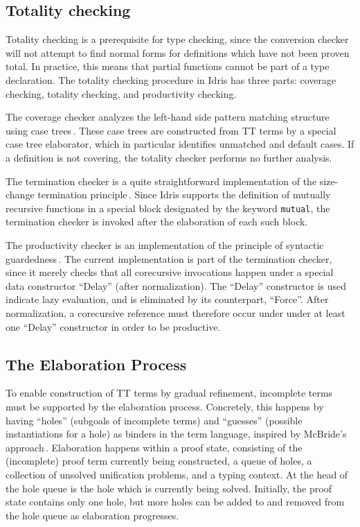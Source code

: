 \subsection{Totality checking}
Totality checking is a prerequisite for type checking, since the conversion
checker will not attempt to find normal forms for definitions which have not
been proven total. In practice, this means that partial functions cannot be part
of a type declaration. The totality
checking procedure in Idris has three parts: coverage checking, totality
checking, and productivity checking.

The coverage checker analyzes the left-hand side pattern matching structure
using case trees\,\citep{Augustsson:1985}. These case trees are constructed from
TT terms by a special case tree elaborator, which in particular identifies
unmatched and default cases. If a definition is not covering, the totality
checker performs no further analysis.

The termination checker is a quite straightforward implementation of the
size-change termination principle\,\citep{LeeJones01SizeChange}. Since Idris
supports the definition of mutually recursive functions in a special block
designated by the keyword \texttt{mutual}, the termination checker
is invoked after the elaboration of each such block.

The productivity checker is an implementation of the principle of
syntactic guardedness\,\citep{Coquand94}. The current implementation is
part of the termination checker, since it merely checks that all
corecursive invocations happen under a special data constructor
``Delay'' (after normalization). The ``Delay'' constructor is used indicate lazy
evaluation, and is eliminated by its counterpart, ``Force''. After normalization,
a corecursive reference must therefore occur under under at least one
``Delay'' constructor in order to be productive.

\subsection{The Elaboration Process}
To enable construction of TT terms by gradual refinement, incomplete terms must
be supported by the elaboration process. Concretely, this happens by having
``holes'' (subgoals of incomplete terms) and ``guesses'' (possible
instantiations for a hole) as binders in the term language, inspired by
McBride's approach\,\citep{McBrideThesis:1999}. Elaboration happens within a
proof state, consisting of the (incomplete) proof term currently being
constructed, a queue of holes, a collection
of unsolved unification problems, and a typing context. At the head of the hole
queue is the hole which is currently being solved. Initially, the proof state
contains only one hole, but more holes can be added to and removed from the hole
queue as elaboration progresses.

